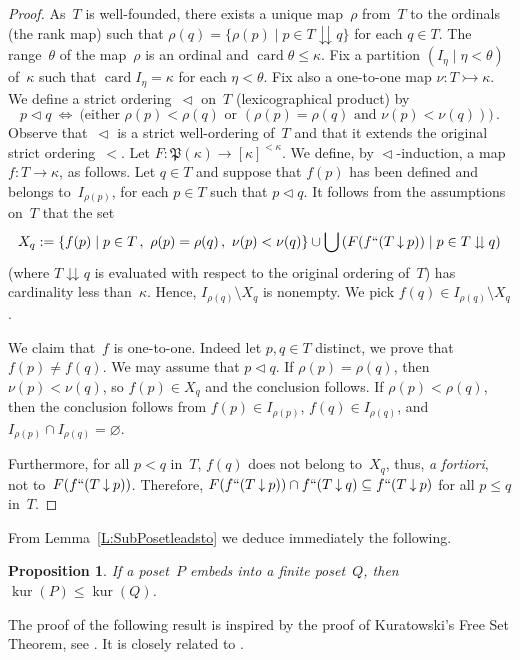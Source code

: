\documentclass[psamsfonts,reqno]{amsart}
\theoremstyle{plain}
\newtheorem{proposition}[lemma]{Proposition}
\theoremstyle{definition}
\theoremstyle{remark}
\numberwithin{equation}{section}
\numberwithin{figure}{section}
\newcommand{\gk}{\kappa}
\newcommand{\gn}{\nu}
\newcommand{\gq}{\theta}
\newcommand{\gr}{\rho}
\newcommand{\gh}{\eta}
\DeclareMathOperator{\kur}{kur}
\DeclareMathOperator{\card}{card}
\newcommand{\Pow}{\mathfrak{P}}
\newcommand{\tr}{\vartriangleleft}
\newcommand{\es}{\varnothing}
\newcommand{\mono}{\rightarrowtail}
\newcommand{\famm}[2]{\left(#1\mid#2\right)}
\newcommand{\set}[1]{\{#1\}}
\newcommand{\setm}[2]{\set{#1\mid#2}}
\newcommand{\dnw}{\mathbin{\downarrow}}
\newcommand{\ddnw}{\mathbin{\downdownarrows}}
\begin{document}
\begin{proof}
As~$T$ is well-founded, there exists a unique map~$\gr$ from~$T$ to the ordinals (the rank map) such that $\gr(q)=\setm{\gr(p)}{p\in T\ddnw q}$ for each $q\in T$. The range~$\gq$ of the map~$\gr$ is an ordinal and $\card\gq\leq\gk$.
Fix a partition $\famm{I_\gh}{\gh<\gq}$ of~$\gk$ such that $\card I_\gh=\gk$ for each $\gh<\gq$. Fix also a one-to-one map $\gn\colon T\mono\gk$. We define a strict ordering~$\tr$ on~$T$ (lexicographical product) by
 \[
 p\tr q\ \Longleftrightarrow\ \bigl(\text{either }\gr(p)<\gr(q)\text{ or }
 (\gr(p)=\gr(q)\text{ and }\gn(p)<\gn(q))\bigr)\,.
 \]
Observe that~$\tr$ is a strict well-ordering of~$T$ and that it extends the original strict ordering~$<$. Let $F\colon\Pow(\gk)\to[\gk]^{<\gk}$. We define, by $\tr$-induction, a map $f\colon T\to\gk$, as follows. Let $q\in T$ and suppose that $f(p)$ has been defined and belongs to~$I_{\gr(p)}$, for each $p\in T$ such that $p\tr q$. It follows from the assumptions on~$T$ that the set
 \[
 X_q:=\setm{f(p)}{p\in T\,,\ \gr(p)=\gr(q)\,,\ \gn(p)<\gn(q)}\cup
 \bigcup\famm{F(f``(T\dnw p))}{p\in T\ddnw q}
 \]
(where $T\ddnw q$ is evaluated with respect to the original ordering of~$T$) has cardinality less than~$\gk$. Hence, $I_{\gr(q)}\setminus X_q$ is nonempty. We pick $f(q)\in I_{\gr(q)}\setminus X_q$.

We claim that~$f$ is one-to-one. Indeed let $p,q\in T$ distinct, we prove that $f(p)\neq f(q)$. We may assume that $p\tr q$. If $\gr(p)=\gr(q)$, then $\gn(p)<\gn(q)$, so $f(p)\in X_q$ and the conclusion follows. If $\gr(p)<\gr(q)$, then the conclusion follows from $f(p)\in I_{\gr(p)}$, $f(q)\in I_{\gr(q)}$, and $I_{\gr(p)}\cap I_{\gr(q)}=\es$.

Furthermore, for all $p<q$ in~$T$, $f(q)$ does not belong to~$X_q$, thus, \emph{a fortiori}, not to~$F(f``(T\dnw p))$. Therefore, $F(f``(T\dnw p))\cap f``(T\dnw q)\subseteq f``(T\dnw p)$ for all $p\leq q$ in~$T$.
\end{proof}

{}From Lemma~\ref{L:SubPosetleadsto} we deduce immediately the following.

\begin{proposition}\label{P:KurIndIncr}
If a poset~$P$ embeds into a finite poset~$Q$, then $\kur(P)\leq\kur(Q)$.
\end{proposition}

The proof of the following result is inspired by the proof of Kuratowski's Free Set Theorem, see \cite[Theorem~46.1]{EHMR}. It is closely related to \cite[Lemme~3.3.7]{GillTh}.
\end{document}
